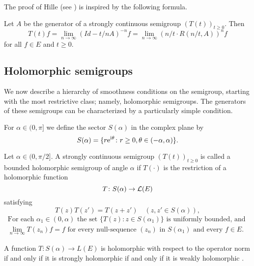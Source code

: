 The proof of Hille (see \citet{kato:1966}) is inspired by the following formula.
\begin{proposition}\label{prop:a2-1.10}
Let $A$ be the generator of a strongly continuous semigroup $(T(t))_{t \geq 0}$.
Then
\begin{equation}\label{eq:a2-1.3}
    T(t)f = \lim_{n \to \infty} (Id - t/nA)^{-n} f = \lim_{n \to \infty} (n/t \cdot R(n/t,A))^{n} f
\end{equation}
for all $f \in E$ and $t \geq 0$.
\end{proposition}
\subsection{Holomorphic semigroups} \label{subsec:a2-1.se4}

We now describe a hierarchy of smoothness conditions on the semigroup, starting with the most restrictive class; namely, holomorphic semigroups.
The generators of these semigroups can be characterized by a particularly simple condition.

For $\alpha \in (0,\pi]$ we define the sector $S(\alpha)$ in the complex plane by
\[
    S(\alpha) = \{r\mathrm{e}^{\mathrm{i}\theta} \colon r \geq 0, \theta \in (-\alpha,\alpha)\} .
\]

\begin{definition}\label{def:a2-1.11}
Let $\alpha \in (0,\pi/2]$.
A strongly continuous semigroup $(T(t))_{t \geq 0}$ is called a bounded holomorphic semigroup of angle $\alpha$ if $T(\cdot)$ is the restriction of a holomorphic function
\[
    T \colon S(\alpha) \to \mathcal{L}(E)
\]
satisfying
\begin{equation}\label{eq:a2-1.4}
    T(z)T(z') = T(z+z') \quad (z,z' \in S(\alpha)),
\end{equation}
\begin{equation}\label{eq:a2-1.5}
\begin{split}
    \text{For each } \alpha_{1} \in (0,\alpha) \text{ the set } \{T(z) \colon z \in S(\alpha_{1})\} \text{ is uniformly bounded, and }\\
     \lim_{n \to \infty} T(z_{n})f = f \text{ for every null-sequence } (z_{n}) \text{ in } S(\alpha_{1}) \text{ and every } f \in E.
\end{split}     
\end{equation}
\end{definition}

\begin{remark*}\label{rem:a2-1.5-kgk}
A function $T \colon S(\alpha) \to L(E)$ is holomorphic with respect to the operator norm if and only if it is strongly holomorphic if and only if it is weakly holomorphic \citet[V.3]{yosida:1965}.
\end{remark*}

